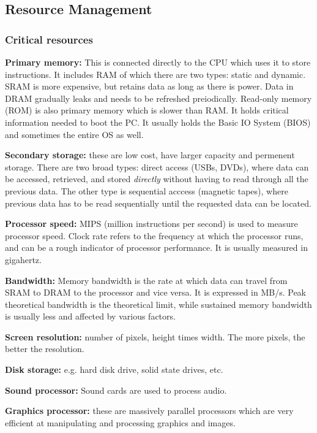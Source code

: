 \documentclass{article}
\begin{document}
\subsection{Resource Management}

\subsubsection{Critical resources}

\textbf{Primary memory:} This is connected directly to the CPU which uses it to
store instructions. It includes RAM of which there are two types: static and
dynamic. SRAM is more expensive, but retains data as long as there is power.
Data in DRAM gradually leaks and needs to be refreshed preiodically. Read-only
memory (ROM) is also primary memory which is slower than RAM. It holds critical
information needed to boot the PC. It usually holds the Basic IO System (BIOS)
and sometimes the entire OS as well.

\textbf{Secondary storage:} these are low cost, have larger capacity and
permenent storage. There are two broad types: direct access (USBs, DVDs), where
data can be accessed, retrieved, and stored \textit{directly} without having
to read through all the previous data. The other type is sequential acccess
(magnetic tapes), where previous data has to be read sequentially until the
requested data can be located.

\textbf{Processor speed:} MIPS (million instructions per second) is used to
measure processor speed. Clock rate refers to the frequency at which the
processor runs, and can be a rough indicator of processor performance. It is
usually measured in gigahertz.

\textbf{Bandwidth:} Memory bandwidth is the rate at which data can travel from
SRAM to DRAM to the processor and vice versa. It is expressed in MB/s. Peak
theoretical bandwidth is the theoretical limit, while sustained memory
bandwidth is usually less and affected by various factors.

\textbf{Screen resolution:} number of pixels, height times width. The more
pixels, the better the resolution.

\textbf{Disk storage:} e.g. hard disk drive, solid state drives, etc.

\textbf{Sound processor:} Sound cards are used to process audio.

\textbf{Graphics processor:} these are massively parallel processors which are
very efficient at manipulating and processing graphics and images.
\end{document}

